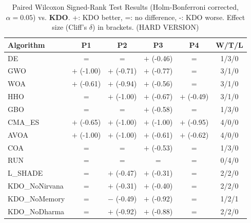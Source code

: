\begin{table}[htbp]
\centering
\caption{Paired Wilcoxon Signed-Rank Test Results (Holm-Bonferroni corrected, $\alpha=0.05$) vs. \textbf{KDO}. +: KDO better, =: no difference, -: KDO worse. Effect size (Cliff's $\delta$) in brackets. (HARD VERSION)}
\label{tab:wilcoxon_advanced}
\small
\begin{tabular}{lccccc}
\toprule
\textbf{Algorithm} & \textbf{P1} & \textbf{P2} & \textbf{P3} & \textbf{P4} & \textbf{W/T/L} \\
\midrule
DE & $=$ & $=$ & $+$ (-0.46) & $=$ & 1/3/0 \\
GWO & $+$ (-1.00) & $+$ (-0.71) & $+$ (-0.77) & $=$ & 3/1/0 \\
WOA & $+$ (-0.61) & $+$ (-0.94) & $+$ (-0.56) & $=$ & 3/1/0 \\
HHO & $=$ & $+$ (-1.00) & $+$ (-0.67) & $+$ (-0.49) & 3/1/0 \\
GBO & $=$ & $=$ & $+$ (-0.58) & $=$ & 1/3/0 \\
CMA_ES & $+$ (-0.65) & $+$ (-1.00) & $+$ (-1.00) & $+$ (-0.95) & 4/0/0 \\
AVOA & $+$ (-1.00) & $+$ (-1.00) & $+$ (-0.61) & $+$ (-0.62) & 4/0/0 \\
COA & $=$ & $=$ & $+$ (-0.53) & $=$ & 1/3/0 \\
RUN & $=$ & $=$ & $=$ & $=$ & 0/4/0 \\
L_SHADE & $=$ & $+$ (-0.47) & $+$ (-0.31) & $=$ & 2/2/0 \\
KDO_NoNirvana & $=$ & $+$ (-0.31) & $+$ (-0.40) & $=$ & 2/2/0 \\
KDO_NoMemory & $=$ & $-$ (-0.49) & $+$ (-0.92) & $=$ & 1/2/1 \\
KDO_NoDharma & $=$ & $+$ (-0.92) & $+$ (-0.88) & $=$ & 2/2/0 \\
\bottomrule
\end{tabular}
\end{table}
